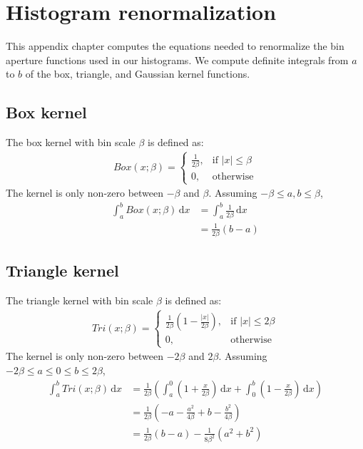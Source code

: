 \documentclass[thesis.tex]{subfiles}
\begin{document}
\appendix
\chapter{Histogram renormalization} \label{apx:histogramRenormalization}
%
This appendix chapter computes the equations needed to renormalize the bin aperture functions used in our histograms. We compute definite integrals from $a$ to $b$ of the box, triangle, and Gaussian kernel functions.
%
\section{Box kernel}
%
The box kernel with bin scale $\beta$ is defined as:
%
\begin{align*}
\mathit{Box} (x; \beta) = 
\begin{cases}
    \frac{1}{2 \beta},& \text{if } |x| \leq \beta \\
    0,              & \text{otherwise}
\end{cases}
\end{align*}
%
The kernel is only non-zero between $-\beta$ and $\beta$. Assuming $-\beta \leq a,b \leq \beta$,
%
\begin{align*}
\int_a^b \mathit{Box} (x; \beta) \,\mathrm dx &= \int_a^b \frac{1}{2 \beta} \,\mathrm dx \\
&= \frac{1}{2 \beta} (b - a)
\end{align*}
%
\section{Triangle kernel}
%
The triangle kernel with bin scale $\beta$ is defined as:
%
\begin{align*}
\mathit{Tri} (x; \beta) = 
\begin{cases}
    \frac{1}{2 \beta} \left( 1 - \frac{| x |}{2 \beta} \right) ,& \text{if } |x| \leq 2 \beta \\
    0,              & \text{otherwise}
\end{cases}
\end{align*}
%
The kernel is only non-zero between $-2\beta$ and $2\beta$. Assuming $-2 \beta \leq a \leq 0 \leq b \leq 2 \beta$,
%
\begin{align*}
\int_a^b \mathit{Tri} (x; \beta) \,\mathrm dx &= \frac{1}{2 \beta} \left( \int_a^0 \left( 1 + \frac{x}{2 \beta} \right) \,\mathrm dx + \int_0^b \left( 1 - \frac{x}{2 \beta} \right) \,\mathrm dx \right) \\
&= \frac{1}{2 \beta} \left( - a - \frac{a^2}{4 \beta} + b - \frac{b^2}{4 \beta} \right) \\
&= \frac{1}{2 \beta} (b - a) - \frac{1}{8 \beta^2} (a^2 + b^2)
\end{align*}
%
\end{document}

